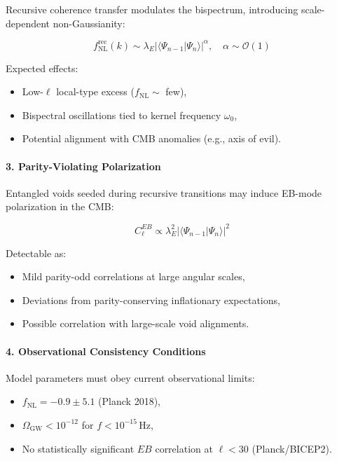Recursive coherence transfer modulates the bispectrum, introducing scale-dependent non-Gaussianity:

\begin{equation}
f_{\text{NL}}^{\text{rec}}(k) \sim \lambda_E |\langle \Psi_{n-1} | \Psi_n \rangle|^\alpha, \quad \alpha \sim \mathcal{O}(1)
\end{equation}

Expected effects:
\begin{itemize}
    \item Low-\( \ell \) local-type excess (\( f_{\text{NL}} \sim \) few),
    \item Bispectral oscillations tied to kernel frequency \( \omega_0 \),
    \item Potential alignment with CMB anomalies (e.g., axis of evil).
\end{itemize}

\paragraph{3. Parity-Violating Polarization}

Entangled voids seeded during recursive transitions may induce EB-mode polarization in the CMB:

\begin{equation}
C_\ell^{EB} \propto \lambda_E^2 |\langle \Psi_{n-1} | \Psi_n \rangle|^2
\end{equation}

Detectable as:
\begin{itemize}
    \item Mild parity-odd correlations at large angular scales,
    \item Deviations from parity-conserving inflationary expectations,
    \item Possible correlation with large-scale void alignments.
\end{itemize}

\paragraph{4. Observational Consistency Conditions}

Model parameters must obey current observational limits:
\begin{itemize}
    \item \( f_{\text{NL}} = -0.9 \pm 5.1 \) (Planck 2018),
    \item \( \Omega_{\text{GW}} < 10^{-12} \) for \( f < 10^{-15} \, \text{Hz} \),
    \item No statistically significant \( EB \) correlation at \( \ell < 30 \) (Planck/BICEP2).
\end{itemize}

